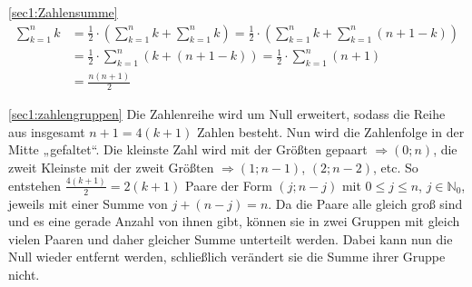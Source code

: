 \documentclass[10pt, a4paper, reqno]{amsart}
\makeatletter
\renewcommand\proofname{Beweis}
\renewenvironment{proof}[1][\proofname]{\par
\pushQED{\qed}%
\normalfont \topsep6\p@\@plus6\p@\relax
\trivlist
\item\relax
{\bfseries#1}\hspace\labelsep\ignorespaces
}{%
\popQED\endtrivlist\@endpefalse
}
\newenvironment{proof_thm}[1]{
\begin{proof}[\proofname~(#1)]}{\end{proof}}
\makeatother
\begin{document}
\begin{proof_thm}{\autoref{sec1:Zahlensumme}}
  \begin{align*}
    \sum^{n}_{k=1}k&=\frac{1}{2}\cdot\left(\sum^{n}_{k=1}k + \sum^{n}_{k=1}k\right) = \frac{1}{2}\cdot\left(\sum^{n}_{k=1}k+\sum^{n}_{k=1}(n+1-k)\right)\\
                   &= \frac{1}{2}\cdot\sum^{n}_{k=1}(k+(n+1-k)) = \frac{1}{2}\cdot\sum^{n}_{k=1}(n+1)\\
                   &= \frac{n(n+1)}{2}
  \end{align*}
\end{proof_thm}
\begin{proof_thm}{\autoref{sec1:zahlengruppen}}
  Die Zahlenreihe wird um Null erweitert, sodass die Reihe aus insgesamt
  $n+1=4(k+1)$ Zahlen besteht. Nun wird die Zahlenfolge in der Mitte „gefaltet“.
  Die kleinste Zahl wird mit der Größten gepaart $\Rightarrow (0;n)$, die zweit
  Kleinste mit der zweit Größten $\Rightarrow (1;n-1)$, $(2;n-2)$, etc. So
  entstehen $\frac{4(k+1)}{2}=2(k+1)$ Paare der Form $(j;n-j)$ mit $0\leq j \leq n$, $j∈ℕ_0$, jeweils mit einer Summe von
  $j+(n-j) = n$. Da die Paare alle gleich groß
  sind und es eine gerade Anzahl von ihnen gibt, können sie in zwei Gruppen mit
  gleich vielen Paaren und daher gleicher Summe unterteilt werden. Dabei kann
  nun die Null wieder entfernt werden, schließlich verändert sie die Summe
  ihrer Gruppe nicht.
\end{proof_thm}
\end{document}
